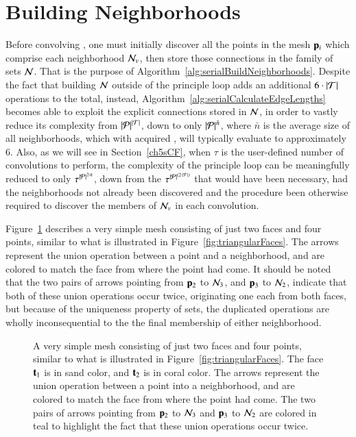 %
%
%
%
\section{Building Neighborhoods}
\label{ch5sBN}
Before convolving , one must initially discover all the points in the mesh $\mathbf{p}_i$ which comprise each neighborhood $\mathcal{N}_v$, then store those connections in the family of sets $\mathcal{N}$. That is the purpose of Algorithm~\ref{alg:serialBuildNeighborhoods}. Despite the fact that building $\mathcal{N}$ outside of the principle loop adds an additional $6\cdot|\mathcal{T}|$ operations to the total, instead, Algorithm~\ref{alg:serialCalculateEdgeLengths} becomes able to exploit the explicit connections stored in $\mathcal{N}$, in order to vastly reduce its complexity from $|\mathcal{P}|^{|\mathcal{T}|}$, down to only $|\mathcal{P}|^{\bar{n}}$, where $\bar{n}$ is the average size of all neighborhoods, which with acquired \tdd{}, will typically evaluate to approximately 6. Also, as we will see in Section~\ref{ch5sCF}, when $\tau$ is the user-defined number of convolutions to perform, the complexity of the principle loop can be meaningfully reduced to only $\tau^{|\mathcal{P}|^{2\cdot\bar{n}}}$, down from the $\tau^{|\mathcal{P}|^{(2\cdot|\mathcal{T}|)}}$ that would have been necessary, had the neighborhoods not already been discovered and the procedure been otherwise required to discover the members of $\mathcal{N}_v$ in each convolution.%
%

Figure~\ref{fig:unionsOfSimpleBuildNeighborhoods} describes a very simple mesh consisting of just two faces and four points, similar to what is illustrated in Figure~\ref{fig:triangularFaces}. The arrows represent the union operation between a point and a neighborhood, and are colored to match the face from where the point had come. It should be noted that the two pairs of arrows pointing from $\mathbf{p}_2$ to $\mathcal{N}_3$, and $\mathbf{p}_3$ to $\mathcal{N}_2$, indicate that both of these union operations occur twice, originating one each from both faces, but because of the uniqueness property of sets, the duplicated operations are wholly inconsequential to the the final membership of either neighborhood.

\begin{figure}[ht]
	
	{\caption[unionsOfSimpleBuildNeighborhoods]{A very simple mesh consisting of just two faces and four points, similar to what is illustrated in Figure~\ref{fig:triangularFaces}. The face $\mathbf{t}_1$ is in sand color, and $\mathbf{t}_2$ is in coral color. The arrows represent the union operation between a point into a neighborhood, and are colored to match the face from where the point had come. The two pairs of arrows pointing from $\mathbf{p}_2$ to $\mathcal{N}_3$ and $\mathbf{p}_3$ to $\mathcal{N}_2$ are colored in teal to highlight the fact that these union operations occur twice.
}\label{fig:unionsOfSimpleBuildNeighborhoods}}
\end{figure}

